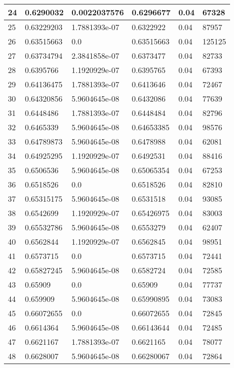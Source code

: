 \begin{longtable}{|l|l|l|l|l|l|}
24 & 0.6290032 & 0.0022037576 & 0.6296677 & 0.04 & 67328 \\ \hline 
25 & 0.63229203 & 1.7881393e-07 & 0.6322922 & 0.04 & 87957 \\ \hline 
26 & 0.63515663 & 0.0 & 0.63515663 & 0.04 & 125125 \\ \hline 
27 & 0.63734794 & 2.3841858e-07 & 0.6373477 & 0.04 & 82733 \\ \hline 
28 & 0.6395766 & 1.1920929e-07 & 0.6395765 & 0.04 & 67393 \\ \hline 
29 & 0.64136475 & 1.7881393e-07 & 0.6413646 & 0.04 & 72467 \\ \hline 
30 & 0.64320856 & 5.9604645e-08 & 0.6432086 & 0.04 & 77639 \\ \hline 
31 & 0.6448486 & 1.7881393e-07 & 0.6448484 & 0.04 & 82796 \\ \hline 
32 & 0.6465339 & 5.9604645e-08 & 0.64653385 & 0.04 & 98576 \\ \hline 
33 & 0.64789873 & 5.9604645e-08 & 0.6478988 & 0.04 & 62081 \\ \hline 
34 & 0.64925295 & 1.1920929e-07 & 0.6492531 & 0.04 & 88416 \\ \hline 
35 & 0.6506536 & 5.9604645e-08 & 0.65065354 & 0.04 & 67253 \\ \hline 
36 & 0.6518526 & 0.0 & 0.6518526 & 0.04 & 82810 \\ \hline 
37 & 0.65315175 & 5.9604645e-08 & 0.6531518 & 0.04 & 93085 \\ \hline 
38 & 0.6542699 & 1.1920929e-07 & 0.65426975 & 0.04 & 83003 \\ \hline 
39 & 0.65532786 & 5.9604645e-08 & 0.6553279 & 0.04 & 62407 \\ \hline 
40 & 0.6562844 & 1.1920929e-07 & 0.6562845 & 0.04 & 98951 \\ \hline 
41 & 0.6573715 & 0.0 & 0.6573715 & 0.04 & 72441 \\ \hline 
42 & 0.65827245 & 5.9604645e-08 & 0.6582724 & 0.04 & 72585 \\ \hline 
43 & 0.65909 & 0.0 & 0.65909 & 0.04 & 77737 \\ \hline 
44 & 0.659909 & 5.9604645e-08 & 0.65990895 & 0.04 & 73083 \\ \hline 
45 & 0.66072655 & 0.0 & 0.66072655 & 0.04 & 72845 \\ \hline 
46 & 0.6614364 & 5.9604645e-08 & 0.66143644 & 0.04 & 72485 \\ \hline 
47 & 0.6621167 & 1.7881393e-07 & 0.6621165 & 0.04 & 78077 \\ \hline 
48 & 0.6628007 & 5.9604645e-08 & 0.66280067 & 0.04 & 72864 \\ \hline 

\end{longtable}
